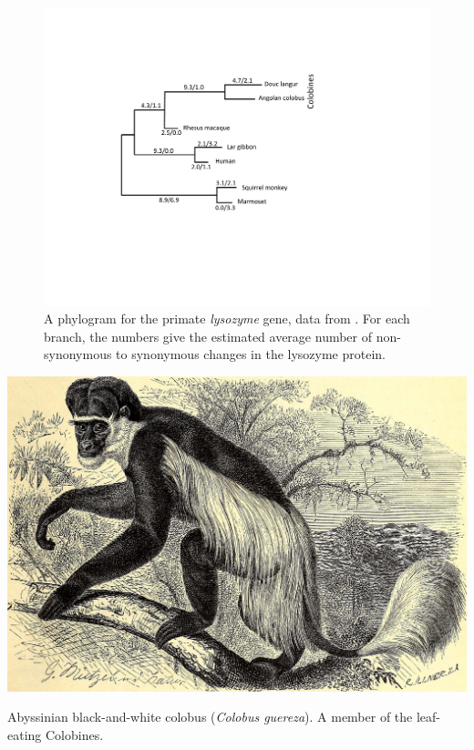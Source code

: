 \begin{figure}
\begin{center}
\includegraphics[width=0.8 \textwidth]{Journal_figs/genetic_drift/Yang_lysozyme/Yang_lysozyme.pdf}
\end{center}
\caption{A phylogram for the primate {\it lysozyme} gene, data from
  \citet{Yang:98}. For each branch, the numbers give the estimated average
number of non-synonymous to synonymous changes in the lysozyme protein.} \label{fig:lysozyme}
\end{figure}
\begin{marginfigure}
\begin{center}
\includegraphics[width=0.8 \textwidth]{illustration_images/Genetic_drift/Colobus/19792029373_fcce706e67_k.jpg}
\end{center}
\caption{Abyssinian black-and-white colobus ({\it Colobus guereza}). A member of the leaf-eating Colobines. } \label{fig:Colobus}
\end{marginfigure}


